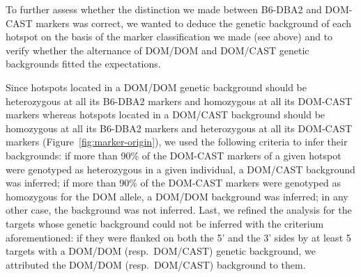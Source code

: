 \begin{mccorrection}

To further assess whether the distinction we made between B6-DBA2 and DOM-CAST markers was correct, we wanted to deduce the genetic background of each hotspot on the basis of the marker classification we made (see above) and to verify whether the alternance of DOM/DOM and DOM/CAST genetic backgrounds fitted the expectations. 
	
Since hotspots located in a DOM/DOM genetic background should be heterozygous at all its B6-DBA2 markers and homozygous at all its DOM-CAST markers whereas hotspots located in a DOM/CAST background should be homozygous at all its B6-DBA2 markers and heterozygous at all its DOM-CAST markers (Figure~\ref{fig:marker-origin}), we used the following criteria to infer their backgrounds:
if more than 90\% of the DOM-CAST markers of a given hotspot were genotyped as heterozygous in a given individual, a DOM/CAST background was inferred;
if more than 90\% of the DOM-CAST markers were genotyped as homozygous for the DOM allele, a DOM/DOM background was inferred;
in any other case, the background was not inferred.
Last, we refined the analysis for the targets whose genetic background could not be inferred with the criterium aforementioned: if they were flanked on both the 5’ and the 3’ sides by at least 5 targets with a DOM/DOM (resp.\ DOM/CAST) genetic background, we attributed the DOM/DOM (resp.\ DOM/CAST) background to them.







\end{mccorrection}
